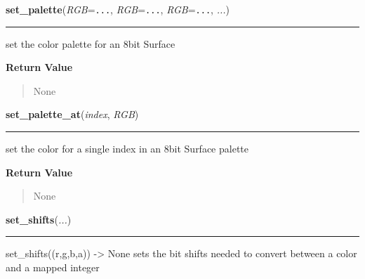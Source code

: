 \hspace{.8\funcindent}\begin{boxedminipage}{\funcwidth}

    \raggedright \textbf{set\_palette}(\textit{RGB}={\tt ...}, \textit{RGB}={\tt ...}, \textit{RGB}={\tt ...}, \textit{...})

    \vspace{-1.5ex}

    \rule{\textwidth}{0.5\fboxrule}
\setlength{\parskip}{2ex}
    set the color palette for an 8bit Surface

\setlength{\parskip}{1ex}
      \textbf{Return Value}
    \vspace{-1ex}

      \begin{quote}
      None

      \end{quote}

    \end{boxedminipage}

    \label{pygame:Surface:set_palette_at}

    \vspace{0.5ex}

\hspace{.8\funcindent}\begin{boxedminipage}{\funcwidth}

    \raggedright \textbf{set\_palette\_at}(\textit{index}, \textit{RGB})

    \vspace{-1.5ex}

    \rule{\textwidth}{0.5\fboxrule}
\setlength{\parskip}{2ex}
    set the color for a single index in an 8bit Surface palette

\setlength{\parskip}{1ex}
      \textbf{Return Value}
    \vspace{-1ex}

      \begin{quote}
      None

      \end{quote}

    \end{boxedminipage}

    \label{pygame:Surface:set_shifts}

    \vspace{0.5ex}

\hspace{.8\funcindent}\begin{boxedminipage}{\funcwidth}

    \raggedright \textbf{set\_shifts}(\textit{...})

    \vspace{-1.5ex}

    \rule{\textwidth}{0.5\fboxrule}
\setlength{\parskip}{2ex}
    set\_shifts((r,g,b,a)) -{\textgreater} None sets the bit shifts needed 
    to convert between a color and a mapped integer

\setlength{\parskip}{1ex}
    \end{boxedminipage}

